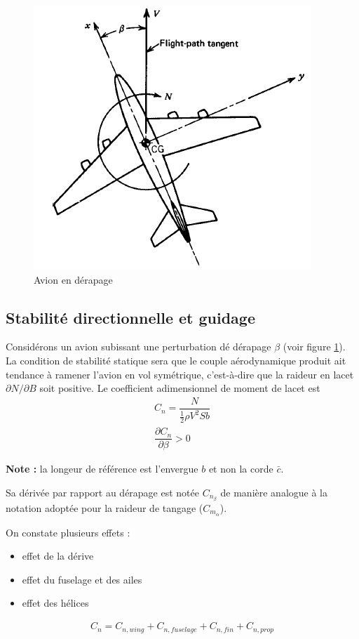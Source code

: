 \documentclass{report}
\begin{document}
\begin{figure}[h!]
    \centering
    \includegraphics[scale=0.7]{29.JPG}
    \caption{Avion en dérapage}
    \label{29}
\end{figure}
\newpage

\subsection{Stabilité directionnelle et guidage}

Considérons un avion subissant une perturbation dé dérapage $\beta$ (voir figure \ref{29}). La condition de stabilité statique sera que le couple aérodynamique produit ait tendance à ramener l'avion en vol symétrique, c'est-à-dire que la raideur en lacet $\partial N/\partial B$ soit positive. Le coefficient adimensionnel de moment de lacet est
\begin{eqnarray}
C_n=\dfrac{N}{\frac{1}{2}\rho V^2 S b}\\
\dfrac{\partial C_n}{\partial\beta}>0
\end{eqnarray}

\textbf{Note :} la longeur de référence est l'envergue $b$ et non la corde $\bar{c}$.

Sa dérivée par rapport au dérapage est notée $C_{n_\beta}$ de manière analogue à la notation adoptée pour la raideur de tangage ($C_{m_\alpha}$).

On constate plusieurs effets :
\begin{itemize}
    \item effet de la dérive
    \item effet du fuselage et des ailes
    \item effet des hélices
\end{itemize}
\begin{eqnarray}
C_n=C_{n,wing}+C_{n,fuselage}+C_{n,fin}+C_{n,prop}
\end{eqnarray}
\end{document}
